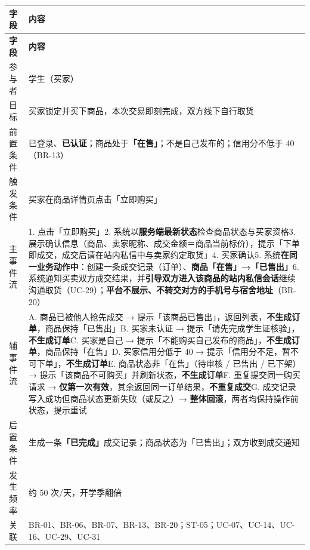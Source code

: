 \documentclass[12pt,a4paper]{ctexart}
\begin{document}
{\scriptsize
\begin{longtable}{|p{2.75cm}|p{13.25cm}|}
\hline
\textbf{字段} & \textbf{内容} \\
\hline
\endfirsthead
\hline
\textbf{字段} & \textbf{内容} \\
\hline
\endhead
\hline
\endfoot
参与者 & 学生（买家） \\
\hline
目标 & 买家锁定并买下商品，本次交易即刻完成，双方线下自行取货 \\
\hline
前置条件 & 已登录、\textbf{已认证}；商品处于\textbf{「在售」}；不是自己发布的；信用分不低于 40（BR-13） \\
\hline
触发条件 & 买家在商品详情页点击「立即购买」 \\
\hline
主事件流 & 1. 点击「立即购买」\newline{}2. 系统以\textbf{服务端最新状态}检查商品状态与买家资格\newline{}3. 展示确认信息（商品、卖家昵称、成交金额＝商品当前标价），提示「下单即成交，成交后请在站内私信中与卖家约定取货」\newline{}4. 买家确认\newline{}5. 系统\textbf{在同一业务动作中}：创建一条成交记录（订单）、\textbf{商品「在售」→「已售出」}\newline{}6. 系统通知买卖双方成交结果，并\textbf{引导双方进入该商品的站内私信会话}继续沟通取货（UC-29）；\textbf{平台不展示、不转交对方的手机号与宿舍地址}（BR-20） \\
\hline
辅事件流 & A. 商品已被他人抢先成交 → 提示「该商品已售出」，返回列表，\textbf{不生成订单}，商品保持「已售出」\newline{}B. 买家未认证 → 提示「请先完成学生证核验」，\textbf{不生成订单}\newline{}C. 买家是自己 → 提示「不能购买自己发布的商品」，\textbf{不生成订单}，商品保持「在售」\newline{}D. 买家信用分低于 40 → 提示「信用分不足，暂不可下单」，\textbf{不生成订单}\newline{}E. 商品状态非「在售」（待审核 / 已售出 / 已下架）→ 提示「该商品不可购买」并刷新状态，\textbf{不生成订单}\newline{}F. 重复提交同一购买请求 → \textbf{仅第一次有效}，其余返回同一订单结果，\textbf{不重复成交}\newline{}G. 成交记录写入成功但商品状态更新失败（或反之）→ \textbf{整体回滚}，两者均保持操作前状态，提示重试 \\
\hline
后置条件 & 生成一条\textbf{「已完成」}成交记录；商品状态为「已售出」；双方收到成交通知 \\
\hline
发生频率 & 约 50 次/天，开学季翻倍 \\
\hline
关联 & BR-01、BR-06、BR-07、BR-13、BR-20；ST-05；UC-07、UC-14、UC-16、UC-29、UC-31 \\
\hline
\end{longtable}
}
\end{document}
